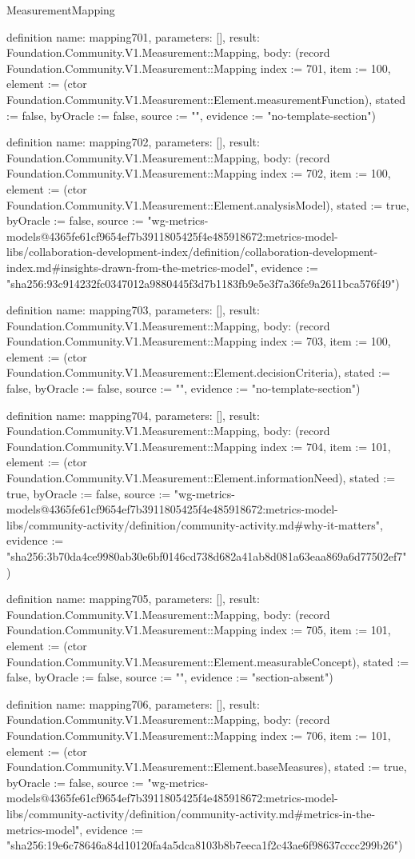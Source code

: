 \begin{lexlean}{MeasurementMapping}
\begin{semanticmodule}
definition{
  name: mapping701,
  parameters: [],
  result: Foundation.Community.V1.Measurement::Mapping,
  body: (record Foundation.Community.V1.Measurement::Mapping {index := 701, item := 100, element := (ctor Foundation.Community.V1.Measurement::Element.measurementFunction), stated := false, byOracle := false, source := "", evidence := "no-template-section"})
}

definition{
  name: mapping702,
  parameters: [],
  result: Foundation.Community.V1.Measurement::Mapping,
  body: (record Foundation.Community.V1.Measurement::Mapping {index := 702, item := 100, element := (ctor Foundation.Community.V1.Measurement::Element.analysisModel), stated := true, byOracle := false, source := "wg-metrics-models@4365fe61cf9654ef7b3911805425f4e485918672:metrics-model-libs/collaboration-development-index/definition/collaboration-development-index.md#insights-drawn-from-the-metrics-model", evidence := "sha256:93c914232fc0347012a9880445f3d7b1183fb9e5e3f7a36fe9a2611bca576f49"})
}

definition{
  name: mapping703,
  parameters: [],
  result: Foundation.Community.V1.Measurement::Mapping,
  body: (record Foundation.Community.V1.Measurement::Mapping {index := 703, item := 100, element := (ctor Foundation.Community.V1.Measurement::Element.decisionCriteria), stated := false, byOracle := false, source := "", evidence := "no-template-section"})
}

definition{
  name: mapping704,
  parameters: [],
  result: Foundation.Community.V1.Measurement::Mapping,
  body: (record Foundation.Community.V1.Measurement::Mapping {index := 704, item := 101, element := (ctor Foundation.Community.V1.Measurement::Element.informationNeed), stated := true, byOracle := false, source := "wg-metrics-models@4365fe61cf9654ef7b3911805425f4e485918672:metrics-model-libs/community-activity/definition/community-activity.md#why-it-matters", evidence := "sha256:3b70da4ce9980ab30e6bf0146cd738d682a41ab8d081a63eaa869a6d77502ef7"})
}

definition{
  name: mapping705,
  parameters: [],
  result: Foundation.Community.V1.Measurement::Mapping,
  body: (record Foundation.Community.V1.Measurement::Mapping {index := 705, item := 101, element := (ctor Foundation.Community.V1.Measurement::Element.measurableConcept), stated := false, byOracle := false, source := "", evidence := "section-absent"})
}

definition{
  name: mapping706,
  parameters: [],
  result: Foundation.Community.V1.Measurement::Mapping,
  body: (record Foundation.Community.V1.Measurement::Mapping {index := 706, item := 101, element := (ctor Foundation.Community.V1.Measurement::Element.baseMeasures), stated := true, byOracle := false, source := "wg-metrics-models@4365fe61cf9654ef7b3911805425f4e485918672:metrics-model-libs/community-activity/definition/community-activity.md#metrics-in-the-metrics-model", evidence := "sha256:19e6c78646a84d10120fa4a5dca8103b8b7eeca1f2c43ae6f98637cccc299b26"})
}


\end{semanticmodule}
\end{lexlean}
